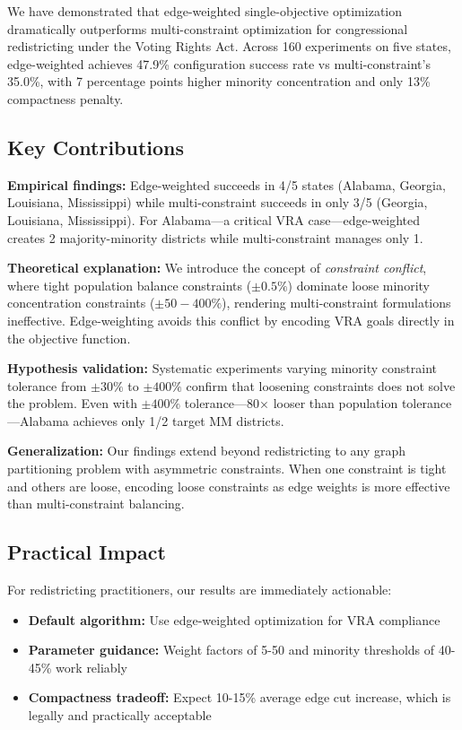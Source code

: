 \label{sec:conclusion}

We have demonstrated that edge-weighted single-objective optimization dramatically outperforms multi-constraint optimization for congressional redistricting under the Voting Rights Act. Across 160 experiments on five states, edge-weighted achieves 47.9\% configuration success rate vs multi-constraint's 35.0\%, with 7 percentage points higher minority concentration and only 13\% compactness penalty.

\subsection{Key Contributions}

\textbf{Empirical findings:} Edge-weighted succeeds in 4/5 states (Alabama, Georgia, Louisiana, Mississippi) while multi-constraint succeeds in only 3/5 (Georgia, Louisiana, Mississippi). For Alabama---a critical VRA case---edge-weighted creates 2 majority-minority districts while multi-constraint manages only 1.

\textbf{Theoretical explanation:} We introduce the concept of \textit{constraint conflict}, where tight population balance constraints ($\pm0.5\%$) dominate loose minority concentration constraints ($\pm50-400\%$), rendering multi-constraint formulations ineffective. Edge-weighting avoids this conflict by encoding VRA goals directly in the objective function.

\textbf{Hypothesis validation:} Systematic experiments varying minority constraint tolerance from $\pm30\%$ to $\pm400\%$ confirm that loosening constraints does not solve the problem. Even with $\pm400\%$ tolerance---80× looser than population tolerance---Alabama achieves only 1/2 target MM districts.

\textbf{Generalization:} Our findings extend beyond redistricting to any graph partitioning problem with asymmetric constraints. When one constraint is tight and others are loose, encoding loose constraints as edge weights is more effective than multi-constraint balancing.

\subsection{Practical Impact}

For redistricting practitioners, our results are immediately actionable:
\begin{itemize}
    \item \textbf{Default algorithm:} Use edge-weighted optimization for VRA compliance
    \item \textbf{Parameter guidance:} Weight factors of 5-50 and minority thresholds of 40-45\% work reliably
    \item \textbf{Compactness tradeoff:} Expect 10-15\% average edge cut increase, which is legally and practically acceptable
\end{itemize}

